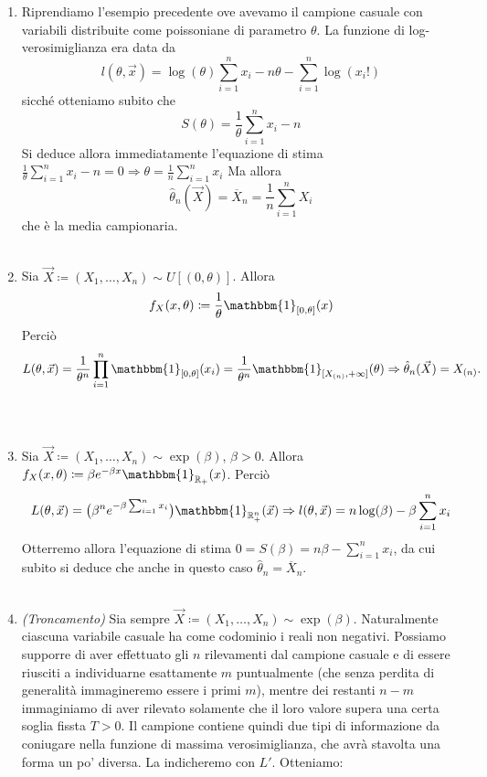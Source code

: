 \begin{enumerate}
\item Riprendiamo l'esempio precedente ove avevamo il campione casuale con variabili distribuite come poissoniane di parametro $\theta$. 
La funzione di log-verosimiglianza era data da $$l(\theta, \vec{x})=\log(\theta)\sum_{i=1}^n x_i   -n\theta - \sum_{i=1}^n \log(x_i !)$$
sicché otteniamo subito che $$S(\theta)=\frac{1}{\theta}\sum_{i=1}^n x_i   -n$$
Si deduce allora immediatamente l'equazione di stima $\frac{1}{\theta}\sum_{i=1}^n x_i   -n=0 \Rightarrow \theta=\frac{1}{n}\sum_{i=1}^n x_i$
Ma allora $$\hat{\theta}_n(\vec{X})=\overline{X}_n=\frac{1}{n}\sum_{i=1}^n X_i$$ che è la media campionaria.\\
\\
\item Sia $\vec{X}\coloneqq (X_1,\ldots,X_n)\sim U[(0,\theta)]$. 
Allora $$f_X(x,\theta)\coloneqq \frac{1}{\theta}\mathbbm{1}_{[0,\theta]}(x)$$ 
Perciò $$L(\theta, \vec{x})=\frac{1}{\theta^n}\prod_{i=1}^n\mathbbm{1}_{[0,\theta]}(x_i)=\frac{1}{\theta^n}\mathbbm{1}_{[X_{(n)},+\infty]}(\theta)\Rightarrow \hat{\theta}_n(\vec{X})=X_{(n)}.$$\\
\\
\item Sia $\vec{X}\coloneqq (X_1,\ldots,X_n)\sim \exp(\beta)$, $\beta>0$. 
Allora $f_X(x,\theta)\coloneqq \beta e^{-\beta x}\mathbbm{1}_{\mathbb{R}_+}(x)$. 
Perciò $$L(\theta, \vec{x})=\big(\beta^n e^{-\beta\sum_{i=1}^n x_i}\big)\mathbbm{1}_{\mathbb{R}_+^n}(\vec{x})\Rightarrow l(\theta, \vec{x})=n\log(\beta)-\beta\sum_{i=1}^n x_i$$ 
Otterremo allora l'equazione di stima $0=S(\beta)=n\beta-\sum_{i=1}^n x_i$, da cui subito si deduce che anche in questo caso $\hat{\theta}_n=\overline{X}_n$.\\
\\
\item \textit{(Troncamento)} Sia sempre $\vec{X}\coloneqq (X_1,\ldots,X_n)\sim \exp(\beta)$. Naturalmente ciascuna variabile casuale ha come codominio i reali non negativi. Possiamo supporre di aver effettuato gli $n$ rilevamenti dal campione casuale e di essere riusciti a individuarne esattamente $m$ puntualmente (che senza perdita di generalità immagineremo essere i primi $m$), mentre dei restanti $n-m$ immaginiamo di aver rilevato solamente che il loro valore supera una certa soglia fissta $T>0$. Il campione contiene quindi due tipi di informazione da coniugare nella funzione di massima verosimiglianza, che avrà stavolta una forma un po' diversa. La indicheremo con $L'$. Otteniamo: \\ 


\end{enumerate}
